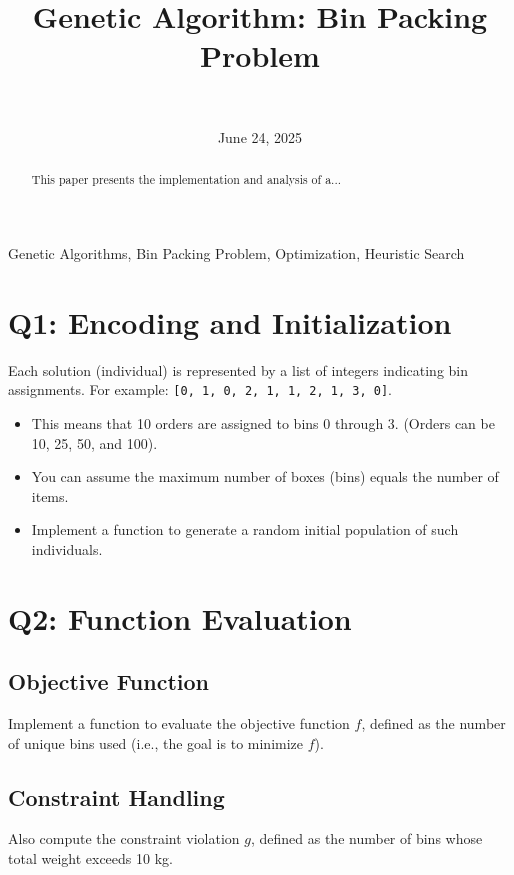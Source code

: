 \documentclass[journal,12pt,onecolumn]{IEEEtran}
\title{Genetic Algorithm: Bin Packing Problem}
\author{
   \IEEEauthorblockN{Matthew D. Branson} \\
   \IEEEauthorblockA{\textit{Department of Computer Science} \\
   \textit{Missouri State University}\\
   Springfield, MO \\
   branson773@live.missouristate.edu
   }
}
\date{June 24, 2025}
\begin{document}
\maketitle

\begin{abstract}
This paper presents the implementation and analysis of a...
\end{abstract}

\begin{IEEEkeywords}
Genetic Algorithms, Bin Packing Problem, Optimization, Heuristic Search
\end{IEEEkeywords}

\section{Q1: Encoding and Initialization}

Each solution (individual) is represented by a list of integers indicating bin assignments. For example: \texttt{[0, 1, 0, 2, 1, 1, 2, 1, 3, 0]}.

\begin{itemize}
    \item This means that 10 orders are assigned to bins 0 through 3. (Orders can be 10, 25, 50, and 100).
    \item You can assume the maximum number of boxes (bins) equals the number of items.
    \item Implement a function to generate a random initial population of such individuals.
\end{itemize}

\section{Q2: Function Evaluation}

\subsection{Objective Function}

Implement a function to evaluate the objective function $f$, defined as the number of unique bins used (i.e., the goal is to minimize $f$).

\subsection{Constraint Handling}

Also compute the constraint violation $g$, defined as the number of bins whose total weight exceeds 10 kg.
\end{document}
